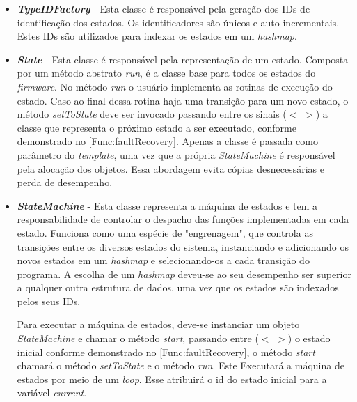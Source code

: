 \begin{itemize}
	\item \textit{\textbf{TypeIDFactory}} - Esta classe é responsável pela geração dos IDs de identificação dos estados. Os identificadores são únicos e auto-incrementais. Estes IDs são utilizados para indexar os estados em um \textit{hashmap}.
	
	\item \textit{\textbf{State}} - Esta classe é responsável pela representação de um estado. Composta por um método abstrato \textit{run}, é a classe base para todos os estados do \textit{firmware}. No método \textit{run} o usuário implementa as rotinas de execução do estado. Caso ao final dessa rotina haja uma transição para um novo estado, o método \textit{setToState} deve ser invocado passando entre os sinais ($<$ $>$) a classe que representa o próximo estado a ser executado, conforme demonstrado no \autoref{Func:faultRecovery}. Apenas a classe é passada como parâmetro do \textit{template}, uma vez que a própria  \textit{StateMachine} é responsável pela alocação dos objetos. Essa abordagem evita cópias desnecessárias e perda de desempenho.
	
	\item \textit{\textbf{StateMachine}} - Esta classe representa a máquina de estados e tem a responsabilidade de controlar o despacho das funções implementadas em cada estado. Funciona como uma espécie de "engrenagem", que controla as transições entre os diversos estados do sistema, instanciando e adicionando os novos estados em um \textit{hashmap} e selecionando-os a cada transição do programa. A escolha de um \textit{hashmap} deveu-se ao seu desempenho ser superior a qualquer outra estrutura de dados, uma vez que os estados são indexados pelos seus IDs.
	
	
 Para executar a máquina de estados, deve-se instanciar um objeto \textit{StateMachine} e chamar o método \textit{start}, passando entre ($<$ $>$) o estado inicial conforme demonstrado no \autoref{Func:faultRecovery}, o método \textit{start} chamará o método \textit{setToState} e o método \textit{run}. Este Executará a máquina de estados por meio de um \textit{loop}. Esse atribuirá o id do estado inicial para a variável \textit{current}. 
	
\end{itemize}


